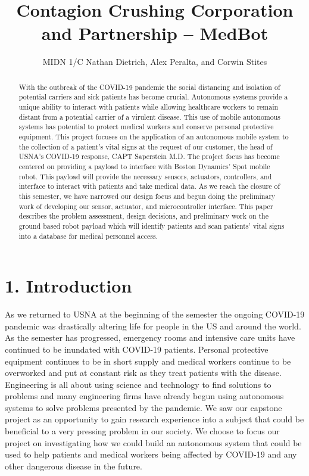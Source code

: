 ﻿\documentclass[10pt]{article}
\title{Contagion Crushing Corporation and Partnership -- MedBot}
\author{MIDN 1/C Nathan Dietrich, Alex Peralta, and Corwin Stites}
\date{\printdate{12/3/2020}}
\begin{document}
\maketitlepage
\cleardoublepage
\tableofcontents

\clearpage
\maketitle
\begin{abstract}
With the outbreak of the COVID-19 pandemic the social distancing and isolation of potential carriers and sick patients has become crucial. Autonomous systems provide a unique ability to interact with patients while allowing healthcare workers to remain distant from a potential carrier of a virulent disease. This use of mobile autonomous systems has potential to protect medical workers and conserve personal protective equipment. This project focuses on the application of an autonomous mobile system to the collection of a patient’s vital signs at the request of our customer, the head of USNA’s COVID-19 response, CAPT Saperstein M.D. The project focus has become centered on providing a payload to interface with Boston Dynamics’ Spot mobile robot. This payload will provide the necessary sensors, actuators, controllers, and interface to interact with patients and take medical data. As we reach the closure of this semester, we have narrowed our design focus and begun doing the preliminary work of developing our sensor, actuator, and microcontroller interface. This paper describes the problem assessment, design decisions, and preliminary work on the ground based robot payload which will identify patients and scan patients’ vital signs into a database for medical personnel access. 
\end{abstract}

\section{1. Introduction}        
As we returned to USNA at the beginning of the semester the ongoing COVID-19 pandemic was drastically altering life for people in the US and  around the world. As the semester has progressed, emergency rooms and intensive care units have continued to be  inundated with COVID-19 patients. Personal protective equipment continues to be in short supply and medical workers continue to be overworked and put at constant risk as they treat patients with the disease. Engineering is all about using science and technology to find solutions to problems and many engineering firms have already begun using autonomous systems to solve problems presented by the pandemic. We saw our capstone project as an opportunity to gain research experience into a subject that could be beneficial to a very pressing problem in our society. We choose to focus our project on investigating how we could build an autonomous system that could be used to help patients and medical workers being affected by COVID-19 and any other dangerous disease in the future.
\end{document}
